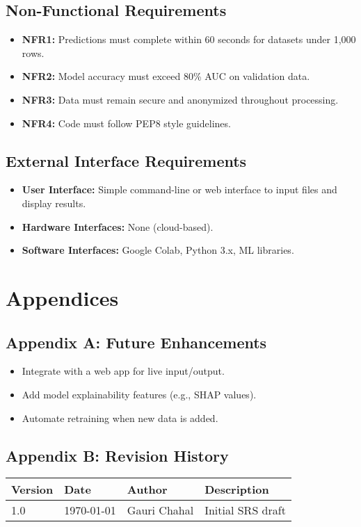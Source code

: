 \documentclass[15pt]{article}
\begin{document}
\subsection{Non-Functional Requirements}
\begin{itemize}
    \item \textbf{NFR1:} Predictions must complete within 60 seconds for datasets under 1,000 rows.
    \item \textbf{NFR2:} Model accuracy must exceed 80\% AUC on validation data.
    \item \textbf{NFR3:} Data must remain secure and anonymized throughout processing.
    \item \textbf{NFR4:} Code must follow PEP8 style guidelines.
\end{itemize}

\subsection{External Interface Requirements}
\begin{itemize}
    \item \textbf{User Interface:} Simple command-line or web interface to input files and display results.
    \item \textbf{Hardware Interfaces:} None (cloud-based).
    \item \textbf{Software Interfaces:} Google Colab, Python 3.x, ML libraries.
\end{itemize}

\section{Appendices}
\subsection{Appendix A: Future Enhancements}
\begin{itemize}
    \item Integrate with a web app for live input/output.
    \item Add model explainability features (e.g., SHAP values).
    \item Automate retraining when new data is added.
\end{itemize}

\subsection{Appendix B: Revision History}
\begin{tabular}{|l|l|l|l|}
\hline
Version & Date & Author & Description \\
\hline
1.0 & \today & Gauri Chahal & Initial SRS draft \\
\hline
\end{tabular}
\end{document}
